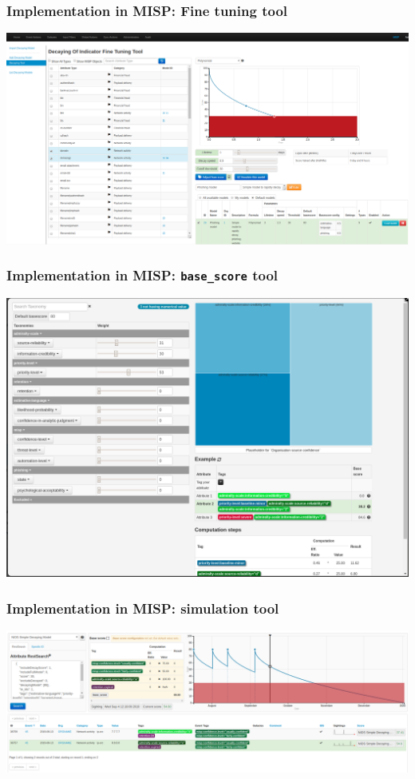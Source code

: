 \begin{frame}
    \frametitle{Implementation in MISP: Fine tuning tool}
    \includegraphics[width=1.00\linewidth]{pics/decaying-tool.png}
\end{frame}

\begin{frame}
    \frametitle{Implementation in MISP: \texttt{base\_score} tool}
    \includegraphics[width=1.00\linewidth]{pics/decaying-basescore.png}
\end{frame}

\begin{frame}
    \frametitle{Implementation in MISP: simulation tool}
    \includegraphics[width=1.00\linewidth]{pics/decaying-simulation.png}
\end{frame}

